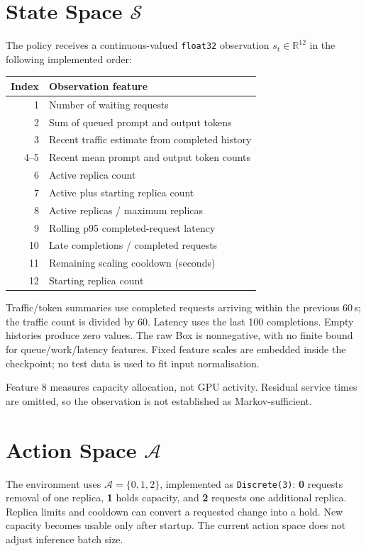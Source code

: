 \documentclass[10pt,a4paper,twocolumn]{article}
\begin{document}
\section{State Space \texorpdfstring{$\mathcal S$}{S}}
The policy receives a continuous-valued \texttt{float32} observation
$s_t\in\mathbb R^{12}$ in the following implemented order:
\begin{center}
\small
\begin{tabularx}{\columnwidth}{@{}r>{\raggedright\arraybackslash}X@{}}
\toprule
Index & Observation feature\\
\midrule
1 & Number of waiting requests\\
2 & Sum of queued prompt and output tokens\\
3 & Recent traffic estimate from completed history\\
4--5 & Recent mean prompt and output token counts\\
6 & Active replica count\\
7 & Active plus starting replica count\\
8 & Active replicas / maximum replicas\\
9 & Rolling p95 completed-request latency\\
10 & Late completions / completed requests\\
11 & Remaining scaling cooldown (seconds)\\
12 & Starting replica count\\
\bottomrule
\end{tabularx}
\end{center}
Traffic/token summaries use completed requests arriving within the previous
60\,s; the traffic count is divided by 60. Latency uses the last 100 completions.
Empty histories produce zero values. The raw Box is nonnegative, with no finite
bound for queue/work/latency features. Fixed feature scales are embedded inside
the checkpoint; no test data is used to fit input normalisation.

Feature 8 measures capacity allocation, not GPU activity. Residual service
times are omitted, so the observation is not established as Markov-sufficient.

\newpage
\section{Action Space \texorpdfstring{$\mathcal A$}{A}}
The environment uses $\mathcal A=\{0,1,2\}$, implemented as
\texttt{Discrete(3)}: \textbf{0} requests removal of one replica,
\textbf{1} holds capacity, and \textbf{2} requests one additional replica.
Replica limits and cooldown can convert a requested change into a hold.
New capacity becomes usable only after startup. The current action space
does not adjust inference batch size.
\end{document}
